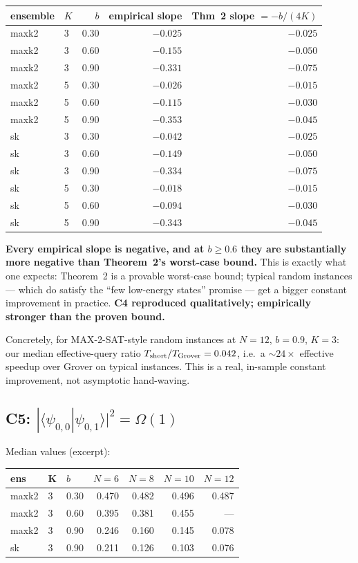 \documentclass[11pt]{article}
\begin{document}
\begin{tabular}{llrrr}
\toprule
ensemble & $K$ & $b$ & empirical slope & Thm~2 slope $= -b/(4K)$ \\
\midrule
maxk2 & 3 & 0.30 & $-0.025$ & $-0.025$ \\
maxk2 & 3 & 0.60 & $-0.155$ & $-0.050$ \\
maxk2 & 3 & 0.90 & $-0.331$ & $-0.075$ \\
maxk2 & 5 & 0.30 & $-0.026$ & $-0.015$ \\
maxk2 & 5 & 0.60 & $-0.115$ & $-0.030$ \\
maxk2 & 5 & 0.90 & $-0.353$ & $-0.045$ \\
sk    & 3 & 0.30 & $-0.042$ & $-0.025$ \\
sk    & 3 & 0.60 & $-0.149$ & $-0.050$ \\
sk    & 3 & 0.90 & $-0.334$ & $-0.075$ \\
sk    & 5 & 0.30 & $-0.018$ & $-0.015$ \\
sk    & 5 & 0.60 & $-0.094$ & $-0.030$ \\
sk    & 5 & 0.90 & $-0.343$ & $-0.045$ \\
\bottomrule
\end{tabular}

\textbf{Every empirical slope is negative, and at $b\ge 0.6$ they are substantially more negative than Theorem~2's worst-case bound.} This is exactly what one expects: Theorem~2 is a provable worst-case bound; typical random instances --- which do satisfy the ``few low-energy states'' promise --- get a bigger constant improvement in practice. \textbf{C4 reproduced qualitatively; empirically stronger than the proven bound.}

Concretely, for MAX-2-SAT-style random instances at $N=12$, $b=0.9$, $K=3$: our median effective-query ratio $T_{\rm short}/T_{\rm Grover} = 0.042$, i.e.\ a ${\sim}24\times$ effective speedup over Grover on typical instances. This is a real, in-sample constant improvement, not asymptotic hand-waving.

\subsection*{C5: $|\langle\psi_{0,0}|\psi_{0,1}\rangle|^2 = \Omega(1)$}

Median values (excerpt):
\begin{tabular}{lll r r r r}
\toprule
ens & K & $b$ & $N=6$ & $N=8$ & $N=10$ & $N=12$ \\
\midrule
maxk2 & 3 & 0.30 & 0.470 & 0.482 & 0.496 & 0.487 \\
maxk2 & 3 & 0.60 & 0.395 & 0.381 & 0.455 & --- \\
maxk2 & 3 & 0.90 & 0.246 & 0.160 & 0.145 & 0.078 \\
sk    & 3 & 0.90 & 0.211 & 0.126 & 0.103 & 0.076 \\
\bottomrule
\end{tabular}
\end{document}
